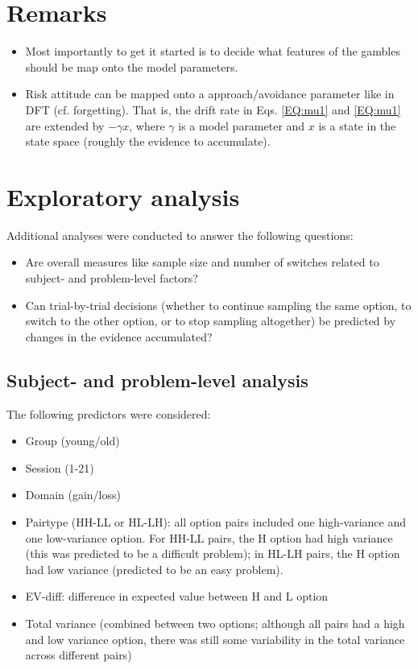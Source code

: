 \documentclass[english,doc]{apa}
\begin{document}
\section{Remarks}
\begin{itemize}
\item Most importantly to get it started is to decide what features of the gambles should be  map onto the model parameters. 
\item Risk attitude can be mapped onto a approach/avoidance parameter like in DFT (cf. forgetting). That is, the drift rate in Eqs. \ref{EQ:mu1} and \ref{EQ:mu1} are extended by $-\gamma x$, where $\gamma$ is a model parameter and $x$ is a state in the state space (roughly the evidence to accumulate). 
\end{itemize}



\section{Exploratory analysis}

Additional analyses were conducted to answer the following questions:

\begin{itemize}
\item Are overall measures like sample size and number of switches related to subject- and problem-level factors?
\item Can trial-by-trial decisions (whether to continue sampling the same option, to switch to the other option, or to stop sampling altogether) be predicted by changes in the evidence accumulated?
\end{itemize}


\subsection{Subject- and problem-level analysis}

The following predictors were considered:

\begin{itemize}
\item Group (young/old)
\item Session (1-21)
\item Domain (gain/loss)
\item Pairtype (HH-LL or HL-LH): all option pairs included one high-variance and one low-variance option. For HH-LL pairs, the H option had high variance (this was predicted to be a difficult problem); in HL-LH pairs, the H option had low variance (predicted to be an easy problem).
\item EV-diff: difference in expected value between H and L option
\item Total variance (combined between two options; although all pairs had a high and low variance option, there was still some variability in the total variance across different pairs)
\end{itemize}
\end{document}
